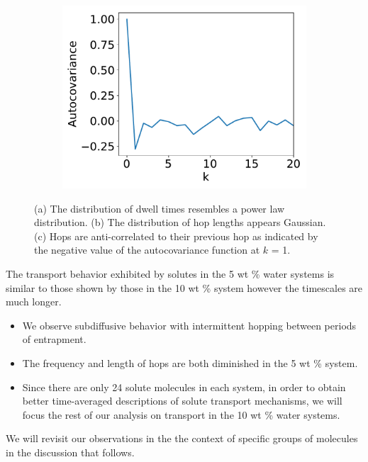 \documentclass{article}
\begin{document}
\begin{figure}
\begin{subfigure}{0.325\textwidth}
  \includegraphics[width=\linewidth]{example_autocovariance.pdf}
  \caption{}\label{fig:example_autocovariance}
  \end{subfigure}
  \caption{(a) The distribution of dwell times resembles a power law distribution. 
  (b) The distribution of hop lengths appears Gaussian. (c) Hops are anti-correlated
  to their previous hop as indicated by the negative value of the autocovariance 
  function at $k$ = 1.}\label{fig:examples}
  \end{figure}
  
  \noindent The transport behavior exhibited by solutes in the 5 wt \% water systems
  is similar to those shown by those in the 10 wt \% system however the timescales are
  much longer.
  \begin{itemize}
    \item We observe subdiffusive behavior with intermittent hopping between
    periods of entrapment.
    \item The frequency and length of hops are both diminished in the 5 wt \% system.
    \item Since there are only 24 solute molecules in each system, in order to obtain
    better time-averaged descriptions of solute transport mechanisms, we will focus
    the rest of our analysis on transport in the 10 wt \% water systems.
  \end{itemize}
  
  We will revisit our observations in the the context of specific groups of 
  molecules in the discussion that follows.
  
\end{document}
